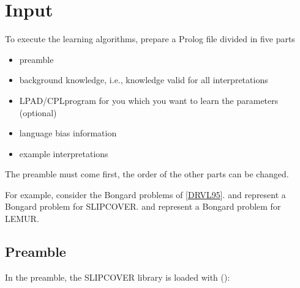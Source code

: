 \documentclass[letterpaper,10pt,english]{sphinxmanual}
\begin{document}
\section{Input}
\label{\detokenize{index:input}}
\sphinxAtStartPar
To execute the learning algorithms, prepare a Prolog file divided in five parts
\begin{itemize}
\item {} 
\sphinxAtStartPar
preamble

\item {} 
\sphinxAtStartPar
background knowledge, i.e., knowledge valid for all interpretations

\item {} 
\sphinxAtStartPar
LPAD/CPL\sphinxhyphen{}program for you which you want to learn the parameters (optional)

\item {} 
\sphinxAtStartPar
language bias information

\item {} 
\sphinxAtStartPar
example interpretations

\end{itemize}

\sphinxAtStartPar
The preamble must come first, the order of the other parts can be changed.

\sphinxAtStartPar
For example, consider the Bongard problems of {[}\hyperlink{cite.index:id63}{DRVL95}{]}.  and  represent a Bongard problem for SLIPCOVER.
 and  represent a Bongard problem for LEMUR.


\subsection{Preamble}
\label{\detokenize{index:preamble}}
\sphinxAtStartPar
In the preamble, the SLIPCOVER library is loaded with ():

\begin{sphinxVerbatim}[commandchars=\\\{\}]
 
\end{sphinxVerbatim}
\end{document}
